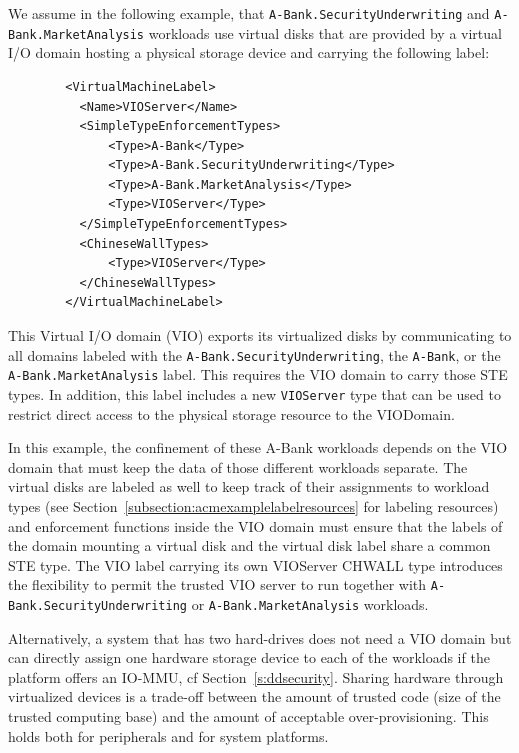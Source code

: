 \documentclass[11pt,twoside,final,openright]{report}
\begin{document}
We assume in the following example, that \verb|A-Bank.SecurityUnderwriting| and
\verb|A-Bank.MarketAnalysis| workloads use virtual disks that are provided
by a virtual I/O domain hosting a physical storage device and carrying
the following label:

\begin{scriptsize}
\begin{verbatim}
        <VirtualMachineLabel>
          <Name>VIOServer</Name>
          <SimpleTypeEnforcementTypes>
              <Type>A-Bank</Type>
              <Type>A-Bank.SecurityUnderwriting</Type>
              <Type>A-Bank.MarketAnalysis</Type>
              <Type>VIOServer</Type>
          </SimpleTypeEnforcementTypes>
          <ChineseWallTypes>
              <Type>VIOServer</Type>
          </ChineseWallTypes>
        </VirtualMachineLabel>
\end{verbatim}
\end{scriptsize}

This Virtual I/O domain (VIO) exports its virtualized disks by
communicating to all domains labeled with the
\verb|A-Bank.SecurityUnderwriting|, the \verb|A-Bank|, or the
\verb|A-Bank.MarketAnalysis| label. This requires the
VIO domain to carry those STE types. In addition, this label includes a
new \verb|VIOServer| type that can be used to restrict direct access to the
physical storage resource to the VIODomain.

In this example, the confinement of  these A-Bank workloads depends on the
VIO domain that must keep the data of those different workloads separate.
The virtual disks are labeled as well to keep track of their assignments
to workload types (see Section~\ref{subsection:acmexamplelabelresources}
for labeling resources) and enforcement functions inside the VIO
domain must ensure that the labels of the domain mounting a virtual
disk and the virtual disk label share a common STE type. The VIO label
carrying its own VIOServer CHWALL type introduces the flexibility to
permit the trusted VIO server to run together with \verb|A-Bank.SecurityUnderwriting|
or \verb|A-Bank.MarketAnalysis| workloads.

Alternatively, a system that has two hard-drives does not need a VIO
domain but can directly assign one hardware storage device to each of
the workloads if the platform offers an IO-MMU, cf
Section~\ref{s:ddsecurity}.  Sharing hardware through virtualized devices
is a trade-off between the amount of trusted code (size of the trusted
computing base) and the amount of acceptable over-provisioning. This
holds both for peripherals and for system platforms.
\end{document}
